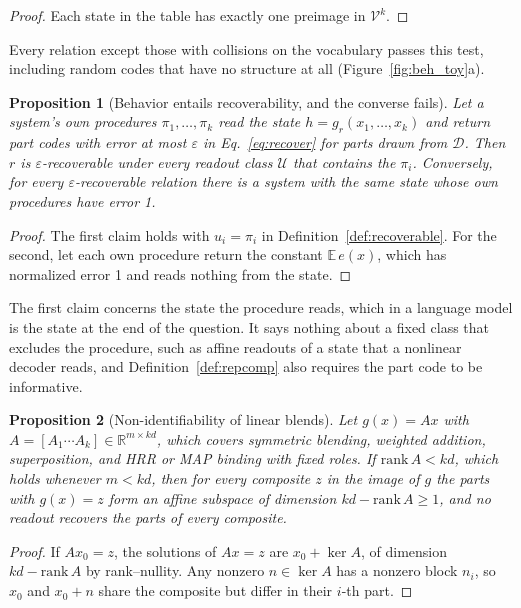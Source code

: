 \documentclass[10pt]{article}
\theoremstyle{plain}
\newtheorem{proposition}{Proposition}
\theoremstyle{remark}
\newcommand{\R}{\mathbb{R}}
\newcommand{\U}{\mathcal{U}}
\newcommand{\D}{\mathcal{D}}
\newcommand{\Voc}{\mathcal{V}}
\begin{document}
\begin{proof}
Each state in the table has exactly one preimage in $\Voc^k$.
\end{proof}

\noindent
Every relation except those with collisions on the vocabulary passes this test, including random codes that have no structure at all (Figure~\ref{fig:beh_toy}a).



\begin{proposition}[Behavior entails recoverability, and the converse fails]
\label{prop:subset}
Let a system's own procedures $\pi_1, \ldots, \pi_k$ read the state $h = g_r(x_1, \ldots, x_k)$ and return part codes with error at most $\varepsilon$ in Eq.~\eqref{eq:recover} for parts drawn from $\D$. Then $r$ is $\varepsilon$-recoverable under every readout class $\U$ that contains the $\pi_i$. Conversely, for every $\varepsilon$-recoverable relation there is a system with the same state whose own procedures have error 1.
\end{proposition}

\begin{proof}
The first claim holds with $u_i = \pi_i$ in Definition~\ref{def:recoverable}. For the second, let each own procedure return the constant $\mathbb{E}\,e(x)$, which has normalized error 1 and reads nothing from the state.
\end{proof}

\noindent
The first claim concerns the state the procedure reads, which in a language model is the state at the end of the question. It says nothing about a fixed class that excludes the procedure, such as affine readouts of a state that a nonlinear decoder reads, and Definition~\ref{def:repcomp} also requires the part code to be informative.

\begin{proposition}[Non-identifiability of linear blends]
\label{prop:fiber}
Let $g(x) = Ax$ with $A = [A_1 \cdots A_k] \in \R^{m \times kd}$, which covers symmetric blending, weighted addition, superposition, and HRR or MAP binding with fixed roles. If $\mathrm{rank}\,A < kd$, which holds whenever $m < kd$, then for every composite $z$ in the image of $g$ the parts with $g(x) = z$ form an affine subspace of dimension $kd - \mathrm{rank}\,A \geq 1$, and no readout recovers the parts of every composite.
\end{proposition}

\begin{proof}
If $Ax_0 = z$, the solutions of $Ax = z$ are $x_0 + \ker A$, of dimension $kd - \mathrm{rank}\,A$ by rank--nullity. Any nonzero $n \in \ker A$ has a nonzero block $n_i$, so $x_0$ and $x_0 + n$ share the composite but differ in their $i$-th part.
\end{proof}
\end{document}
